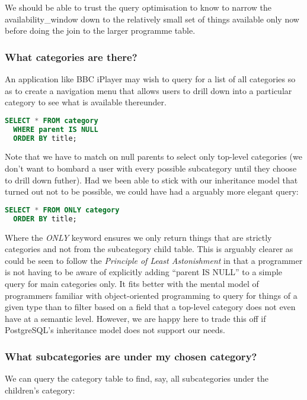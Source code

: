 \documentclass[11pt,a4paper]{article}
\begin{document}
We should be able to trust the query optimisation to know to
narrow the availability\_window down to the relatively small set
of things available only now before doing the join to the larger
programme table.

\subsubsection{What categories are there?}

An application like BBC iPlayer may wish to query for a list of all
categories so as to create a navigation menu that allows users
to drill down into a particular category to see what is
available thereunder.

\begin{lstlisting}[language=SQL]
  SELECT * FROM category
  WHERE parent IS NULL
  ORDER BY title;
\end{lstlisting}

Note that we have to match on null parents to select only
top-level categories (we don't want to bombard a user with every
possible subcategory until they choose to drill down futher). Had
we been able to stick with our inheritance model that turned out
not to be possible, we could have had a arguably more elegant
query:

\begin{lstlisting}[language=SQL]
  SELECT * FROM ONLY category
  ORDER BY title;
\end{lstlisting}

Where the \emph{ONLY} keyword ensures we only return things that
are strictly categories and not from the subcategory child table.
This is arguably clearer as could be seen to follow the
\emph{Principle of Least Astonishment}
\cite{saltzer2009principles}
in that a programmer
is not having to be aware of explicitly adding ``parent IS NULL''
to a simple query for main categories only. It fits better with
the mental model of programmers familiar with object-oriented
programming to query for things of a given type than to filter
based on a field that a top-level category does not even have
at a semantic level. However, we are happy here to trade this
off if PostgreSQL's inheritance model does not support our needs.

\subsubsection{What subcategories are under my chosen category?}

We can query the category table to find, say, all subcategories under
the children's category:
\end{document}
